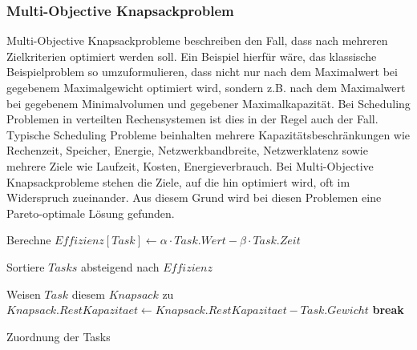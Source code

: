 \subsubsection{Multi-Objective Knapsackproblem}

Multi-Objective Knapsackprobleme beschreiben den Fall, dass nach mehreren Zielkriterien optimiert werden soll. Ein Beispiel hierfür wäre, das klassische Beispielproblem so umzuformulieren, dass nicht nur nach dem Maximalwert bei gegebenem Maximalgewicht optimiert wird, sondern z.B. nach dem Maximalwert bei gegebenem Minimalvolumen und gegebener Maximalkapazität. Bei Scheduling Problemen in verteilten Rechensystemen ist dies in der Regel auch der Fall. Typische Scheduling Probleme beinhalten mehrere Kapazitätsbeschränkungen wie Rechenzeit, Speicher, Energie, Netzwerkbandbreite, Netzwerklatenz sowie mehrere Ziele wie Laufzeit, Kosten, Energieverbrauch. Bei Multi-Objective Knapsackprobleme stehen die Ziele, auf die hin optimiert wird, oft im Widerspruch zueinander. Aus diesem Grund wird bei diesen Problemen eine Pareto-optimale Lösung gefunden. 

\begin{algorithmic}
    
        \State Berechne $Effizienz[Task] \leftarrow \alpha \cdot Task.Wert - \beta \cdot Task.Zeit$
    \EndFor
    
    \State Sortiere $Tasks$ absteigend nach $Effizienz$
    
                \State Weisen $Task$ diesem $Knapsack$ zu
                \State $Knapsack.RestKapazitaet \leftarrow Knapsack.RestKapazitaet - Task.Gewicht$
                \State \textbf{break}
            \EndIf
        \EndFor
    \EndFor

    \State \Return Zuordnung der Tasks
    \EndFunction
\end{algorithmic}